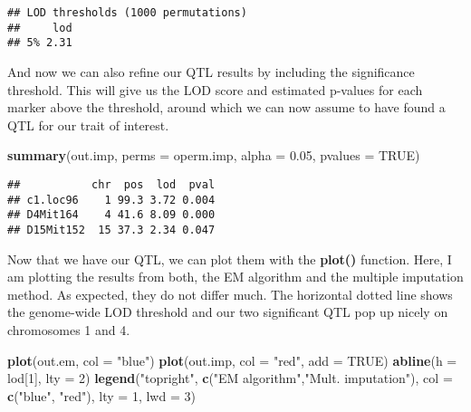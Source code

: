 \documentclass[12pt,]{krantz}
\makeatletter
\newenvironment{Shaded}{\begin{snugshade}}{\end{snugshade}}
\newcommand{\KeywordTok}[1]{\textcolor[rgb]{0.27,0.27,0.27}{\textbf{{#1}}}}
\newcommand{\DataTypeTok}[1]{\textcolor[rgb]{0.27,0.27,0.27}{{#1}}}
\newcommand{\DecValTok}[1]{\textcolor[rgb]{0.06,0.06,0.06}{{#1}}}
\newcommand{\FloatTok}[1]{\textcolor[rgb]{0.06,0.06,0.06}{{#1}}}
\newcommand{\StringTok}[1]{\textcolor[rgb]{0.5,0.5,0.5}{{#1}}}
\newcommand{\OtherTok}[1]{\textcolor[rgb]{0.37,0.37,0.37}{{#1}}}
\newcommand{\NormalTok}[1]{{#1}}
\newenvironment{kframe}{%
\medskip{}
\setlength{\fboxsep}{.8em}
 \def\at@end@of@kframe{}%
 \ifinner\ifhmode%
  \def\at@end@of@kframe{\end{minipage}}%
  \begin{minipage}{\columnwidth}%
 \fi\fi%
 \def\FrameCommand##1{\hskip\@totalleftmargin \hskip-\fboxsep
 \colorbox{shadecolor}{##1}\hskip-\fboxsep
     \hskip-\linewidth \hskip-\@totalleftmargin \hskip\columnwidth}%
 \MakeFramed {\advance\hsize-\width
   \@totalleftmargin\z@ \linewidth\hsize
   \@setminipage}}%
 {\par\unskip\endMakeFramed%
 \at@end@of@kframe}
\renewenvironment{Shaded}{\begin{kframe}}{\end{kframe}}
\makeatother
\begin{document}
\begin{verbatim}
## LOD thresholds (1000 permutations)
##     lod
## 5% 2.31
\end{verbatim}

And now we can also refine our QTL results by including the significance
threshold. This will give us the LOD score and estimated p-values for
each marker above the threshold, around which we can now assume to have
found a QTL for our trait of interest.

\begin{Shaded}
\begin{Highlighting}[]
\KeywordTok{summary}\NormalTok{(out.imp, }\DataTypeTok{perms =} \NormalTok{operm.imp, }\DataTypeTok{alpha =} \FloatTok{0.05}\NormalTok{, }\DataTypeTok{pvalues =} \OtherTok{TRUE}\NormalTok{)}
\end{Highlighting}
\end{Shaded}

\begin{verbatim}
##           chr  pos  lod  pval
## c1.loc96    1 99.3 3.72 0.004
## D4Mit164    4 41.6 8.09 0.000
## D15Mit152  15 37.3 2.34 0.047
\end{verbatim}

Now that we have our QTL, we can plot them with the \textbf{plot()}
function. Here, I am plotting the results from both, the EM algorithm
and the multiple imputation method. As expected, they do not differ
much. The horizontal dotted line shows the genome-wide LOD threshold and
our two significant QTL pop up nicely on chromosomes 1 and 4.

\begin{Shaded}
\begin{Highlighting}[]
\KeywordTok{plot}\NormalTok{(out.em, }\DataTypeTok{col =} \StringTok{"blue"}\NormalTok{)}
\KeywordTok{plot}\NormalTok{(out.imp, }\DataTypeTok{col =} \StringTok{"red"}\NormalTok{, }\DataTypeTok{add =} \OtherTok{TRUE}\NormalTok{)}
\KeywordTok{abline}\NormalTok{(}\DataTypeTok{h =} \NormalTok{lod[}\DecValTok{1}\NormalTok{], }\DataTypeTok{lty =} \DecValTok{2}\NormalTok{)}
\KeywordTok{legend}\NormalTok{(}\StringTok{"topright"}\NormalTok{, }\KeywordTok{c}\NormalTok{(}\StringTok{"EM algorithm"}\NormalTok{,}\StringTok{"Mult. imputation"}\NormalTok{), }\DataTypeTok{col =} \KeywordTok{c}\NormalTok{(}\StringTok{"blue"}\NormalTok{, }\StringTok{"red"}\NormalTok{), }\DataTypeTok{lty =} \DecValTok{1}\NormalTok{, }\DataTypeTok{lwd =} \DecValTok{3}\NormalTok{)}
\end{Highlighting}
\end{Shaded}
\end{document}
